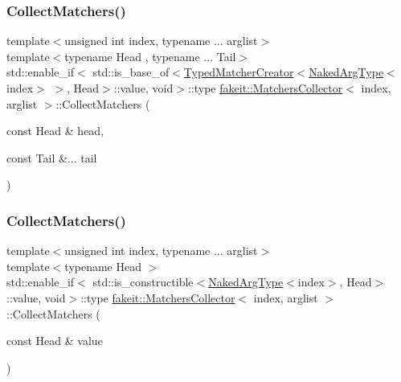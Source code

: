 \mbox{\label{classfakeit_1_1MatchersCollector_a40994e9802e933fb1bae91870d666dcb}} 
\subsubsection{\texorpdfstring{CollectMatchers()}{CollectMatchers()}\hspace{0.1cm}{\footnotesize\ttfamily [44/63]}}
{\footnotesize\ttfamily template$<$unsigned int index, typename ... arglist$>$ \\
template$<$typename Head , typename ... Tail$>$ \\
std\+::enable\+\_\+if$<$ std\+::is\+\_\+base\+\_\+of$<$\mbox{\hyperlink{structfakeit_1_1TypedMatcherCreator}{Typed\+Matcher\+Creator}}$<$\mbox{\hyperlink{classfakeit_1_1MatchersCollector_aeda8ced6a2f0cb7c6e4f916f18a91730}{Naked\+Arg\+Type}}$<$index$>$ $>$, Head$>$\+::value, void$>$\+::type \mbox{\hyperlink{classfakeit_1_1MatchersCollector}{fakeit\+::\+Matchers\+Collector}}$<$ index, arglist $>$\+::Collect\+Matchers (\begin{DoxyParamCaption}\item[{const Head \&}]{head,  }\item[{const Tail \&...}]{tail }\end{DoxyParamCaption})\hspace{0.3cm}{\ttfamily [inline]}}

\mbox{\label{classfakeit_1_1MatchersCollector_affd243a89f758239d77c70dce6318087}} 
\subsubsection{\texorpdfstring{CollectMatchers()}{CollectMatchers()}\hspace{0.1cm}{\footnotesize\ttfamily [45/63]}}
{\footnotesize\ttfamily template$<$unsigned int index, typename ... arglist$>$ \\
template$<$typename Head $>$ \\
std\+::enable\+\_\+if$<$ std\+::is\+\_\+constructible$<$\mbox{\hyperlink{classfakeit_1_1MatchersCollector_aeda8ced6a2f0cb7c6e4f916f18a91730}{Naked\+Arg\+Type}}$<$index$>$, Head$>$\+::value, void$>$\+::type \mbox{\hyperlink{classfakeit_1_1MatchersCollector}{fakeit\+::\+Matchers\+Collector}}$<$ index, arglist $>$\+::Collect\+Matchers (\begin{DoxyParamCaption}\item[{const Head \&}]{value }\end{DoxyParamCaption})\hspace{0.3cm}{\ttfamily [inline]}}

